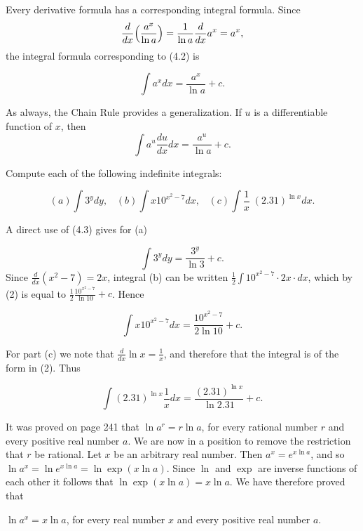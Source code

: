 Every derivative formula has a corresponding integral formula. Since
$$
\frac{d}{dx} \Bigl( \frac{a^x}{ \ln a} \Bigr) = \frac{1}{\ln a} \frac{d}{dx} a^{x} = a^{x},
$$
\noindent the integral formula corresponding to (4.2) is

\begin{theorem} %
$$
\int a^x dx = \frac{a^x}{\ln a} + c.  
$$
\end{theorem}

As always, the Chain Rule provides a generalization. If $u$ is a differentiable function of $x$, then
\begin{equation}
\int a^{u} \frac{du}{dx} dx = \frac{a^u}{\ln a} + c.
\label{eq5.4.2}
\end{equation}


\begin{example}
Compute each of the following indefinite integrals:

$$
(a) \int 3^{y}dy, \;\;\; (b) \int x 10^{x^2 - 7} dx, \;\;\; (c) \int\frac{1}{x}\; (2.31)^{\ln x} dx.
$$

\noindent A direct use of (4.3) gives for (a)

$$
\int  3^{y} dy = \frac{ 3^y}{\ln 3} + c.
$$
\noindent Since $\frac{d}{dx}(x^2 - 7) = 2x$, integral (b) can be written 
$\frac{1}{2} \int 10^{x^2 - 7} \cdot 2x \cdot dx$, which by (2) is equal to 
$\frac{1}{2} \frac{10^{x^2 - 7}}{\ln 10}
+ c$. Hence

$$
\int x 10^{x^2 - 7} dx = \frac{10^{x^{2} - 7}}{2 \ln 10} + c.
$$

\noindent For part (c) we note that $\frac{d}{dx} \ln x = \frac{1}{x}$, and therefore that the integral is of the form in (2). Thus

$$
\int (2.31)^{\ln x} \frac{1}{x}dx = \frac{(2.31)^{\ln x}}{\ln 2.31} + c.
$$
\end{example}

It was proved on page 241 that $\ln a^r = r \ln a$, for every rational number $r$ and every positive real number $a$. We are now in a position to remove the restriction that $r$ be rational. Let $x$ be an arbitrary real number. Then $a^x = e^{x \ln a}$, and so $\ln a^x = \ln e^{x \ln a} = \ln \exp(x \ln a)$.  Since $\ln$ and $\exp$ are inverse functions of each other it follows that 
$\ln \exp(x \ln a) = x \ln a$.  We have therefore proved that

 
\begin{theorem} %
$\ln a^x = x \ln a$, for every real number $x$ and every positive real number $a$. 
\end{theorem}

